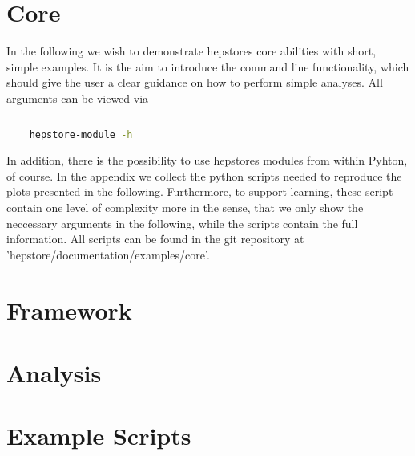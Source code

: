 

\chapter{Core}

In the following we wish to demonstrate hepstores core abilities with
short, simple examples. It is the aim to introduce the command line
functionality, which should give the user a clear guidance on how to
perform simple analyses. All arguments can be viewed via
%
\begin{changemargin}{1.5cm}{1.5cm} 
  \begin{lstlisting}[language=Bash]
    
    hepstore-module -h
  \end{lstlisting}
\end{changemargin}
%
In addition, there is the possibility to use hepstores modules from
within Pyhton, of course. In the appendix we collect the python
scripts needed to reproduce the plots presented in the
following. Furthermore, to support learning, these script contain one
level of complexity more in the sense, that we only show the
neccessary arguments in the following, while the scripts contain the
full information. All scripts can be found in the git repository at
'hepstore/documentation/examples/core'.







\chapter{Framework}



\chapter{Analysis}




\chapter{Example Scripts}

